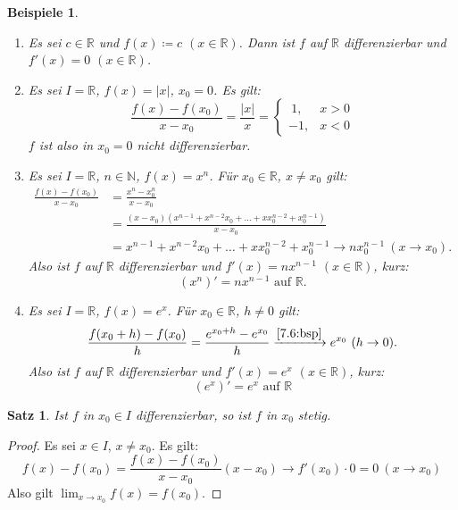 \documentclass[12pt]{extreport} %
\newcommand{\N}{\mathbb{N}}
\newcommand{\R}{\mathbb{R}}
\theoremstyle{named}
\theoremstyle{itshape}
\newtheorem{satz}[unnamedtheorem]{Satz}
\theoremstyle{normal}
\newtheorem*{beispiele}{Beispiele}
\begin{document}
{\begin{beispiele} ~\
	\begin{enumerate}
		\item Es sei $c \in \R$ und $f(x) \coloneqq c$ $(x \in \R)$. Dann ist $f$ auf $\R$ differenzierbar und $f'(x)=0$ $(x \in \R)$.
		\item Es sei $I = \R$, $f(x) = |x|$, $x_{0} = 0$. Es gilt: 
			$$ \frac{f(x) - f(x_{0})}{x - x_{0}} = \frac{|x|}{x} = \begin{cases} ~1, & x > 0 \\ -1, & x < 0 \end{cases} $$ 
			$f$ ist also in $x_{0} = 0$ nicht differenzierbar.
		\item Es sei $I = \R$, $n \in \N$, $f(x) = x^{n}$. Für $x_{0} \in \R$, $x \neq x_{0}$ gilt:
			\begin{align*}
				\frac{f(x) - f(x_{0})}{x - x_{0}} & = \frac{x^{n} - x_{0}^{n}}{x - x_{0}} \\
					& = \frac{(x - x_{0}) (x^{n-1} + x^{n-2} x_{0} + \dotsc + x x_{0}^{n-2} + x_{0}^{n-1})}{x - x_{0}} \\
					& = x^{n-1} + x^{n-2} x_{0} + \dotsc + x x_{0}^{n-2} + x_{0}^{n-1} \rightarrow n x_{0}^{n-1} ~(x \rightarrow x_{0}). 
			\end{align*} 
			Also ist $f$ auf $\R$ differenzierbar und $f'(x) = n x^{n-1}$ $(x \in \R)$, kurz:
				$$ (x^{n})' = n x^{n-1} \text{ auf } \R. $$
		\item Es sei $I = \R$, $f(x) = e^{x}$. Für $x_{0} \in \R$, $h \neq 0$ gilt: 
		 	$$ \frac{f(x_{0} + h) - f(x_{0})}{h} = \frac{e^{x_{0} + h} - e^{x_{0}}}{h} \xrightarrow[]{\ref{7.6:bsp}} e^{x_{0}} ~(h \rightarrow 0). $$ 
		 	Also ist $f$ auf $\R$ differenzierbar und $f'(x) = e^{x}$ $(x \in \R)$, kurz:
		 		$$ (e^{x})' = e^{x} \text{ auf } \R $$
	\end{enumerate}	
\end{beispiele}


\begin{satz} \label{9.1:satz}
	Ist $f$ in $x_{0} \in I$ differenzierbar, so ist $f$ in $x_{0}$ stetig.
\end{satz}

\begin{proof}
	Es sei $x \in I$, $x \neq x_{0}$. Es gilt:
		$$ f(x) - f(x_{0}) = \frac{f(x) - f(x_{0})}{x - x_{0}} (x - x_{0}) \rightarrow f'(x_0) \cdot 0 = 0 ~(x \rightarrow x_{0}) $$
	Also gilt $\lim_{x \rightarrow x_{0}} f(x) = f(x_{0})$.
\end{proof}

}
\end{document}
